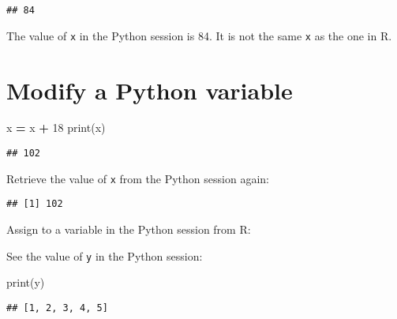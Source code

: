 \documentclass[]{book}
\newenvironment{Shaded}{\begin{snugshade}}{\end{snugshade}}
\newcommand{\BuiltInTok}[1]{#1}
\newcommand{\DecValTok}[1]{\textcolor[rgb]{0.00,0.00,0.81}{#1}}
\newcommand{\NormalTok}[1]{#1}
\newcommand{\OperatorTok}[1]{\textcolor[rgb]{0.81,0.36,0.00}{\textbf{#1}}}
\newcommand{\StringTok}[1]{\textcolor[rgb]{0.31,0.60,0.02}{#1}}
\begin{document}
\begin{verbatim}
## 84
\end{verbatim}

The value of \texttt{x} in the Python session is 84.
It is not the same \texttt{x} as the one in R.

\hypertarget{modify-a-python-variable}{%
\section{Modify a Python variable}\label{modify-a-python-variable}}

\begin{Shaded}
\begin{Highlighting}[]
\NormalTok{x }\OperatorTok{=}\NormalTok{ x }\OperatorTok{+} \DecValTok{18} 
\BuiltInTok{print}\NormalTok{(x)}
\end{Highlighting}
\end{Shaded}

\begin{verbatim}
## 102
\end{verbatim}

Retrieve the value of \texttt{x} from the Python session again:

\begin{Shaded}
\end{Shaded}

\begin{verbatim}
## [1] 102
\end{verbatim}

Assign to a variable in the Python session from R:

\begin{Shaded}
\end{Shaded}

See the value of \texttt{y} in the Python session:

\begin{Shaded}
\begin{Highlighting}[]
\BuiltInTok{print}\NormalTok{(y)}
\end{Highlighting}
\end{Shaded}

\begin{verbatim}
## [1, 2, 3, 4, 5]
\end{verbatim}
\end{document}

